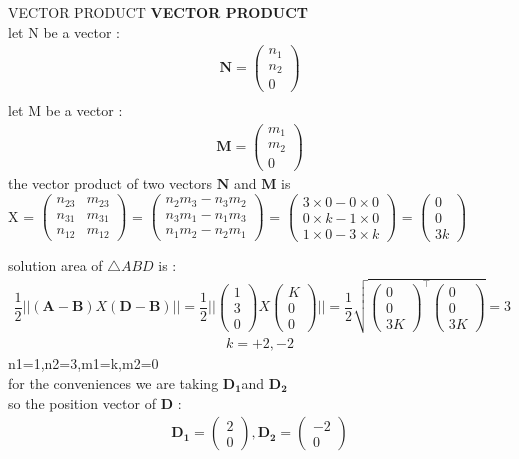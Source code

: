 \documentclass{beamer}
\let\vec\mathbf
\theoremstyle{remark}
\newcommand{\myvec}[1]{\ensuremath{\begin{pmatrix}#1\end{pmatrix}}}
\numberwithin{equation}{section}
\begin{document}
     \begin{frame}{VECTOR PRODUCT}
     \textbf{VECTOR PRODUCT}
\\
let N be a vector :
\begin{align}
    \vec{N}=\myvec{n_1\\n_2\\0}
    \\
    \end{align}
    let M be a vector :
    \begin{align}
    \vec{M}=\myvec{m_1\\m_2\\0}
\end{align}
the vector product of two vectors $\vec{N}$ and $\vec{M}$ is 
\\
\vec{N}X\vec{M} =
\myvec{
n_{23} & m_{23} \\
n_{31} & m_{31} \\
n_{12} & m_{12}
}
=
\myvec{
n_2 m_3 - n_3 m_2 \\
n_3 m_1 - n_1 m_3 \\
n_1 m_2 - n_2 m_1
}
=
\myvec{
3 \times 0 - 0 \times 0 \\
0 \times k - 1 \times 0 \\
1 \times 0 - 3 \times k
}
=
\myvec{
0 \\
0 \\
3k
}
\end{frame}
     \begin{frame}{solution}
         {area of $\triangle ABD$ is :}
\begin{align*}
    \dfrac{1}{2}||(\vec{A}-  \vec{B})X(\vec{D} -  \vec{B})||=\dfrac{1}{2}||\myvec{1\\3\\0}X\myvec{
    K\\0\\0}||= \dfrac{1}{2}\sqrt{\myvec{0\\0\\3K}^\top\myvec{0\\0\\3K}}=3
    \end{align*}
    \begin{align*}
        k=+2,-2
    \end{align*}
    n1=1,n2=3,m1=k,m2=0
\\
for the conveniences we are taking  $\vec{D_1}$and $\vec{D_2}$
\\
    so the position vector of $\vec{D}$ :
    \begin{align*}
        \vec{D_1}=\myvec{2\\0},\vec{D_2}=\myvec{-2\\0}
    \end{align*}
     \end{frame}
\end{document}
